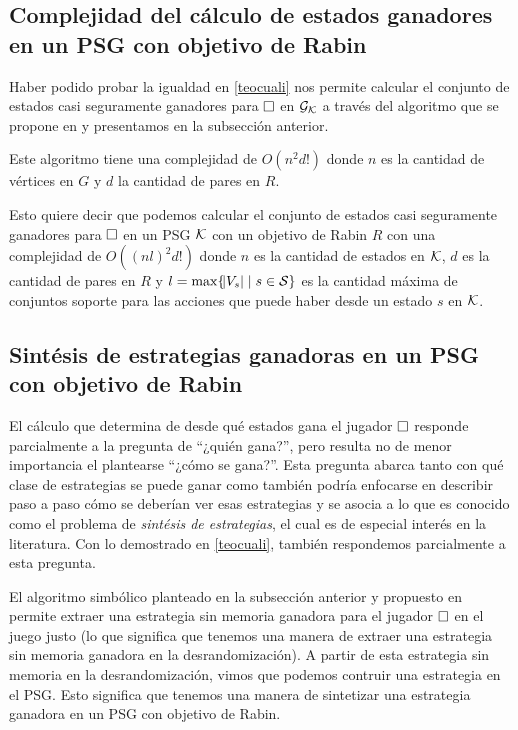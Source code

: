 \subsection*{Complejidad del cálculo de estados ganadores en un PSG con objetivo de Rabin}

Haber podido probar la igualdad en \ref{teocuali} nos permite calcular el
conjunto de estados casi seguramente ganadores para $\square$ en $\mathcal{G}_{\mathcal{K}}$ a través
del algoritmo que se propone en \cite{Banerjee} y presentamos en la subsección
anterior.

Este algoritmo tiene una complejidad de $O(n^2 d!)$ donde $n$ es la cantidad de
vértices en $G$ y $d$ la cantidad de pares en $R$.

Esto quiere decir que podemos calcular el conjunto de estados casi seguramente
ganadores para $\square$ en un PSG $\mathcal{K}$ con un objetivo de Rabin $R$ con una
complejidad de $O((n l)^2 d! )$ donde $n$ es la cantidad de estados en $\mathcal{K}$,
$d$ es la cantidad de pares en $R$ y $l = \max \{\abs{V_s} \mid s \in \mathcal{S} \}$
es la cantidad máxima de conjuntos soporte para las acciones que puede haber
desde un estado $s$ en $\mathcal{K}$.

\subsection*{Sintésis de estrategias ganadoras en un PSG con objetivo de Rabin}

El cálculo que determina de desde qué estados gana el jugador $\square$ responde
parcialmente a la pregunta de ``¿quién gana?'', pero resulta no de menor
importancia el plantearse ``¿cómo se gana?''. Esta pregunta abarca tanto con
qué clase de estrategias se puede ganar como también podría enfocarse en
describir paso a paso cómo se deberían ver esas estrategias y se asocia a lo
que es conocido como el problema de \textit{sintésis de estrategias}, el cual
es de especial interés en la literatura. Con lo demostrado en \ref{teocuali},
también respondemos parcialmente a esta pregunta.

El algoritmo simbólico planteado en la subsección anterior y propuesto en
\cite{Banerjee} permite extraer una estrategia sin memoria ganadora para el
jugador $\square$ en el juego justo (lo que significa que tenemos una manera de
extraer una estrategia sin memoria ganadora en la desrandomización). A partir
de esta estrategia sin memoria en la desrandomización, vimos que podemos
contruir una estrategia en el PSG. Esto significa que tenemos una manera de
sintetizar una estrategia ganadora en un PSG con objetivo de Rabin.

